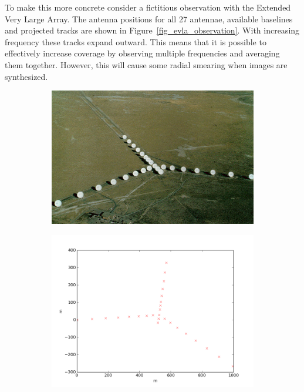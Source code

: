 To make this more concrete consider a fictitious observation with the Extended Very Large Array. The antenna 
positions for all 27 antennae, available baselines and projected tracks are shown in Figure~\ref{fig_evla_observation}. With
increasing frequency these tracks expand outward. This means that it is possible to effectively increase coverage
by observing multiple frequencies and averaging them together. However, this will cause some radial smearing when
images are synthesized.

\begin{figure}[h]
 \begin{mdframed}
 \centering
 \begin{subfigure}[b]{0.3\textwidth}
  \includegraphics[width=\textwidth]{images/vla.jpg}
  \caption{}
 \end{subfigure}
 \begin{subfigure}[b]{0.3\textwidth}
  \includegraphics[width=\textwidth]{images/evla_observation/array_config.png}

\end{subfigure}
\end{mdframed}
\end{figure}
